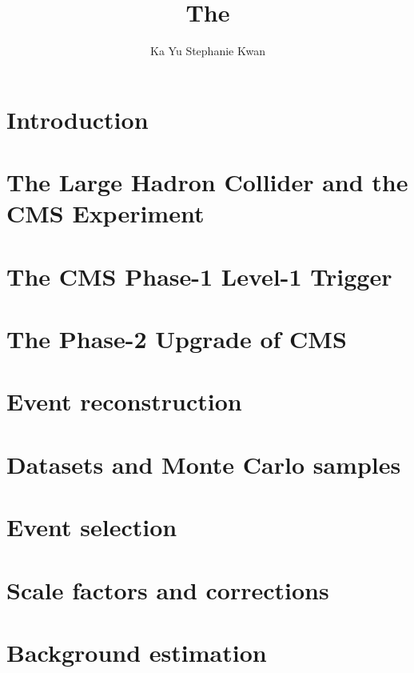 \documentclass[12pt,lot,lof]{puthesis}
\title{The}
\author{Ka Yu Stephanie Kwan}
\begin{document}
\chapter{Introduction}


\chapter{The Large Hadron Collider and the CMS Experiment}


\chapter{The CMS Phase-1 Level-1 Trigger}


\chapter{The Phase-2 Upgrade of CMS}


\chapter{Event reconstruction}


\chapter{Datasets and Monte Carlo samples}


\chapter{Event selection}


\chapter{Scale factors and corrections}


\chapter{Background estimation}

% 


 \label{bib}
\end{document}
